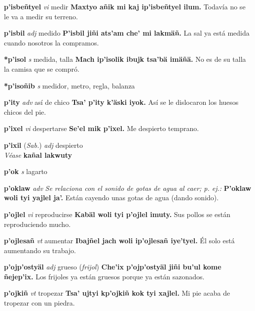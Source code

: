 \documentclass[10pt]{scrbook}
\newcommand{\entry}[1]{\textbf{#1}}
\newcommand{\nontranslationdef}[1]{\textit{#1}}
\newcommand{\partofspeech}[1]{\textit{#1}}
\newcommand{\spanishtranslation}[1]{#1}
\newcommand{\clarification}[1]{(\textit{#1})}
\newcommand{\cholexample}[1]{\textbf{#1}}
\newcommand{\exampletranslation}[1]{#1}
\newcommand{\alsosee}[1]{\\\textit{Véase} \textbf{#1}}
\newcommand{\relevantdialect}[1]{(\textit{#1})}
\begin{document}
\begin{multicols}{2}
\entry{p'isbeñtyel}
\partofspeech{vi}
\spanishtranslation{medir}
\cholexample{Maxtyo añik mi kaj ip'isbeñtyel ilum.}
\exampletranslation{Todavía no se le va a medir su terreno.}

\entry{p'isbil}
\partofspeech{adj}
\spanishtranslation{medido}
\cholexample{P'isbil jiñi ats'am che' mi lakmäñ.}
\exampletranslation{La sal ya está medida cuando nosotros la compramos.}

\entry{*p'isol}
\partofspeech{s}
\spanishtranslation{medida, talla}
\cholexample{Mach ip'isolik ibujk tsa'bä imäñä.}
\exampletranslation{No es de su talla la camisa que se compró.}

\entry{*p'isoñib}
\partofspeech{s}
\spanishtranslation{medidor, metro, regla, balanza}

\entry{p'ity}
\partofspeech{adv}
\spanishtranslation{así de chico}
\cholexample{Tsa' p'ity k'äski iyok.}
\exampletranslation{Así se le dislocaron los huesos chicos del pie.}

\entry{p'ixel}
\partofspeech{vi}
\spanishtranslation{despertarse}
\cholexample{Se'el mik p'ixel.}
\exampletranslation{Me despierto temprano.}

\entry{p'ixil}
\relevantdialect{Sab.}
\partofspeech{adj}
\spanishtranslation{despierto}
\alsosee{kañal lakwuty}

\entry{p'ok}
\partofspeech{s}
\spanishtranslation{lagarto}

\entry{p'oklaw}
\partofspeech{adv}
\nontranslationdef{Se relaciona con el sonido de gotas de agua al caer; p. ej.:}
\cholexample{P'oklaw woli tyi yajlel ja'.}
\exampletranslation{Están cayendo unas gotas de agua (dando sonido).}

\entry{p'ojlel}
\partofspeech{vi}
\spanishtranslation{reproducirse}
\cholexample{Kabäl woli tyi p'ojlel imuty.}
\exampletranslation{Sus pollos se están reproduciendo mucho.}

\entry{p'ojlesañ}
\partofspeech{vt}
\spanishtranslation{aumentar}
\cholexample{Ibajñel jach woli ip'ojlesañ iye'tyel.}
\exampletranslation{Él solo está aumentando su trabajo.}

\entry{p'ojp'ostyäl}
\partofspeech{adj}
\spanishtranslation{grueso}
\clarification{frijol}
\cholexample{Che'ix p'ojp'ostyäl jiñi bu'ul kome ñejep'ix.}
\exampletranslation{Los frijoles ya están gruesos porque ya están sazonados.}

\entry{p'ojkiñ}
\partofspeech{vt}
\spanishtranslation{tropezar}
\cholexample{Tsa' ujtyi kp'ojkiñ kok tyi xajlel.}
\exampletranslation{Mi pie acaba de tropezar con un piedra.}


\end{multicols}
\end{document}
